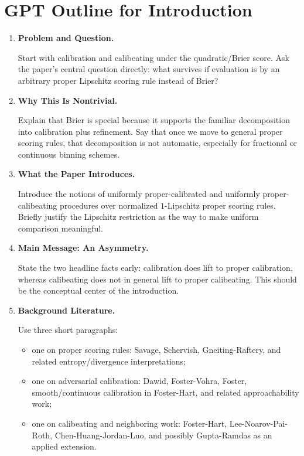 \section*{GPT Outline for Introduction}

\begin{enumerate}
\item \textbf{Problem and Question.}

Start with calibration and calibeating under the quadratic/Brier score.
Ask the paper's central question directly: what survives if evaluation is
by an arbitrary proper Lipschitz scoring rule instead of Brier?

\item \textbf{Why This Is Nontrivial.}

Explain that Brier is special because it supports the familiar
decomposition into calibration plus refinement. Say that once we move to
general proper scoring rules, that decomposition is not automatic,
especially for fractional or continuous binning schemes.

\item \textbf{What the Paper Introduces.}

Introduce the notions of uniformly proper-calibrated and uniformly
proper-calibeating procedures over normalized $1$-Lipschitz proper
scoring rules. Briefly justify the Lipschitz restriction as the way to
make uniform comparison meaningful.

\item \textbf{Main Message: An Asymmetry.}

State the two headline facts early: calibration does lift to proper
calibration, whereas calibeating does not in general lift to proper
calibeating. This should be the conceptual center of the introduction.

\item \textbf{Background Literature.}

Use three short paragraphs:

\begin{itemize}
\item one on proper scoring rules: Savage, Schervish, Gneiting-Raftery,
and related entropy/divergence interpretations;
\item one on adversarial calibration: Dawid, Foster-Vohra, Foster,
smooth/continuous calibration in Foster-Hart, and related
approachability work;
\item one on calibeating and neighboring work: Foster-Hart,
Lee-Noarov-Pai-Roth, Chen-Huang-Jordan-Luo, and possibly Gupta-Ramdas
as an applied extension.
\end{itemize}


\end{enumerate}

